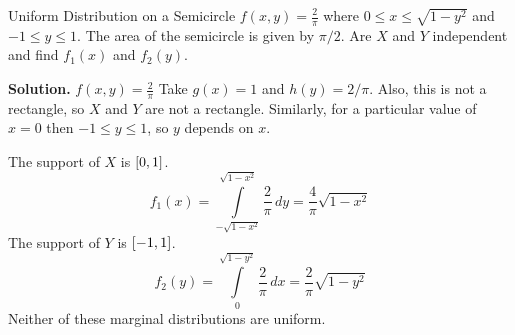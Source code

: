 \begin{Example}{Uniform Distribution on a Semicircle}{}
    $ \displaystyle f(x,y)=\frac{2}{\pi} $ where $ 0\leqslant x\leqslant \sqrt{1-y^2} $
    and $ -1\leqslant y\leqslant 1 $. The area of the semicircle
    is given by $ \pi/2 $. Are $ X $ and $ Y $ independent and find
    $ f_1(x) $ and $ f_2(y) $.

    \textbf{Solution.} $ \displaystyle f(x,y)=\frac{2}{\pi} $
    Take $ g(x)=1 $ and $ h(y)=2/\pi $. Also,
    this is not a rectangle, so $ X $ and $ Y $ are not a rectangle.
    Similarly, for a particular value of $ x=0 $
    then $ -1\leqslant y\leqslant 1 $, so $ y $ depends on $ x $.

    The support of $ X $ is $ \interval{0}{1} $.
    \[ f_1(x)=\int\limits_{-\sqrt{1-x^2}}^{\sqrt{1-x^2}} \frac{2}{\pi} \, d{y}=
        \frac{4}{\pi}\sqrt{1-x^2}  \]
    The support of $ Y $ is $ \interval{-1}{1} $.
    \[ f_2(y)=
        \int\limits_{0}^{\sqrt{1-y^2}} \frac{2}{\pi} \, d{x}=
        \frac{2}{\pi} \sqrt{1-y^2}  \]
    Neither of these marginal distributions are uniform.
\end{Example}
